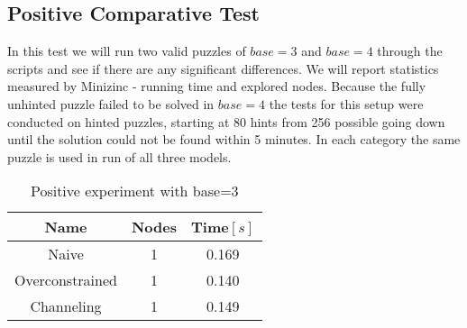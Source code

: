 \documentclass[10pt,a4paper,oneside]{article}
\begin{document}
\subsection{Positive Comparative Test}
In this test we will run two valid puzzles of $  base=3$ and $ base=4 $ through the scripts and see if there are any significant differences. We will report statistics measured by Minizinc - running time and explored nodes. Because the fully unhinted puzzle failed to be solved in $ base=4 $ the tests for this setup were conducted on hinted puzzles, starting at 80 hints from 256 possible going down until the solution could not be found within 5 minutes. In each category the same puzzle is used in run of all three models.
\begin{table}[H] 
\begin{center}
\begin{tabular}{||c|| c c ||}
\hline 
Name & Nodes & Time$ \left[s\right] $ \\ [0.5ex] 
 \hline\hline
 Naive & 1 & 0.169  \\ 
 \hline
 Overconstrained & 1 & 0.140  \\
 \hline
 Channeling & 1 & 0.149  \\
 \hline
\end{tabular}
\end{center}
\caption{Positive experiment with base=3}
\end{table}
\end{document}
